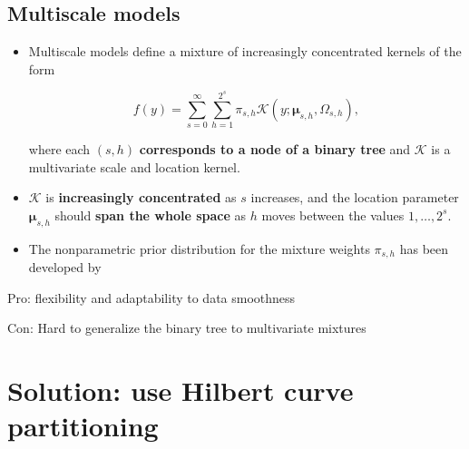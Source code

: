 \documentclass[a0,portrait]{a0poster}
\begin{document}
\begin{multicols}{2}
\subsection*{Multiscale models}
\color{Black}

\begin{itemize}
    \item[] Multiscale models define a mixture of increasingly concentrated kernels of the form

        \[
            f(y) = \sum_{s=0}^{\infty }\sum_{h=1}^{2^{s}} \pi_{s,h} \mathcal{K}(y; \bm{\mu}_{s,h}, \Omega_{s,h}),
        \]

        where each $(s,h)$ \textbf{corresponds to a node of a binary tree} and $ \mathcal{K}$ is a multivariate scale and location kernel.
        
    \item[] $ \mathcal{K}$ is \textbf{increasingly concentrated} as $ s$ increases, and the location parameter $ \bm{\mu}_{s,h}$ should \textbf{span the whole space} as $ h$ moves between the values $ 1, \ldots, 2^{s}$.

    \item[] The nonparametric prior distribution for the mixture weights $ \pi_{s,h}$ has been developed by \citet{canale2016b}
        
\end{itemize}


\color{Black}
\begin{center}\vspace{1cm}
  
\end{center}\vspace{1cm}

\begin{flushright}
    \color{ForestGreen}
    \smiley{} Pro: flexibility and adaptability to data smoothness

\noindent
\color{red}
\frownie{} Con: Hard to generalize the binary tree to multivariate mixtures
\end{flushright}


\color{DarkRed}
\section*{Solution: use Hilbert curve partitioning}
\color{Black}


\end{multicols}
\end{document}
